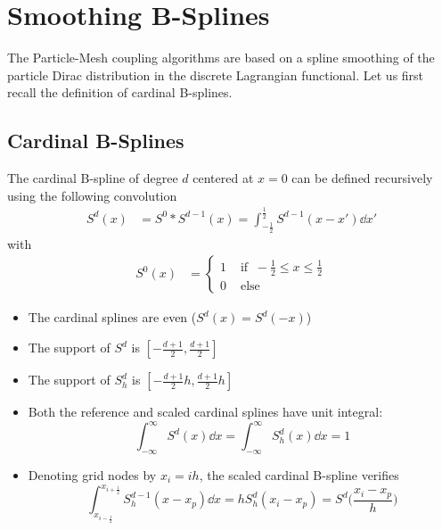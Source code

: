 \documentclass[11pt]{article}
\begin{document}



\section{Smoothing B-Splines}

The Particle-Mesh coupling algorithms are based on a spline smoothing of the 
particle Dirac distribution in the discrete Lagrangian functional.
Let us first recall the definition of cardinal B-splines.

\subsection{Cardinal B-Splines}
\label{sec:card_B_splines}

The cardinal B-spline of degree $d$ centered at $x=0$ can be defined
recursively using the following convolution
\begin{align*}
S^d(x) &= S^0 * S^{d-1} (x) = \int_{-\frac{1}{2}}^{\frac{1}{2}} S^{d-1} (x-x') \dd x'
\end{align*}
with 
\begin{align*}
S^0(x) &= \begin{cases}
     1  &\text{ if } ~ -\frac{1}{2} \leq x \leq \frac{1}{2} \\ 
     0 & \text{ else} 
          \end{cases}
\end{align*}
\begin{itemize}
    \item The cardinal splines are even ($S^d(x) = S^d(-x)$)
    \item The support of $S^d$ is $\left[-\frac{d+1}{2},\frac{d+1}{2}\right]$
    \item The support of $S^d_h$ is $\left[-\frac{d+1}{2}h,\frac{d+1}{2}h\right]$ 
    \item Both the
    reference and scaled cardinal splines have unit integral:
    $$ \int_{-\infty}^{\infty} S^d(x) \dd x = \int_{-\infty}^{\infty} S_h^d(x) \dd x = 1$$
    \item Denoting grid nodes by $x_i = ih$, the scaled cardinal B-spline verifies
    \begin{equation} \label{eq:splinerel}
        \int_{x_{i-\frac{1}{2}}}^{x_{i+\frac{1}{2}}} S_h^{d-1}(x-x_p)\dd x = hS_h^d(x_i-x_p) = S^d\Big(\frac {x_i-x_p}{h}\Big)
    \end{equation}
\end{itemize}
\end{document}
